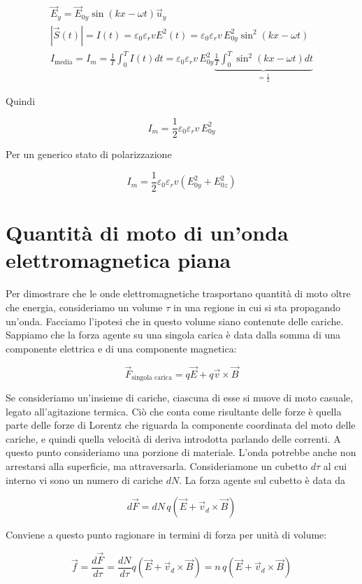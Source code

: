 \begin{gather*}
	\vec{E}_y = \vec{E}_{0y}\sin (kx-\omega t)\vec{u}_y \\
	|\vec{S} (t)| = I(t) = \varepsilon_0 \varepsilon_r vE^2 (t) = \varepsilon_0 \varepsilon_r v\,E_{0y}^2 \sin^2 (kx-\omega t) \\
	I_{\text{media}}= I_m = \frac{1}{T}\int_0^T I(t) dt = \varepsilon_0 \varepsilon_r v\,E_{0y}^2 \underbrace{\frac{1}{T} \int_0^T \sin^2 (kx-\omega t)dt}_{= \frac{1}{2}}
\end{gather*}

Quindi

\[
	I_m = \frac{1}{2} \varepsilon_0 \varepsilon_r v\,E_{0y}^2
\]

Per un generico stato di polarizzazione

\[
	\boxed{I_m = \frac{1}{2} \varepsilon_0 \varepsilon_r v \left( E_{0y}^2 + E_{0z}^2 \right)}
\]

\section{Quantità di moto di un'onda elettromagnetica piana}

Per dimostrare che le onde elettromagnetiche trasportano quantità di moto oltre che energia, consideriamo un volume $ \tau  $ in una regione in cui si sta propagando un'onda. Facciamo l'ipotesi che in questo volume siano contenute delle cariche. Sappiamo che la forza agente su una singola carica è data dalla somma di una componente elettrica e di una componente magnetica:

\[
	\vec{F}_{\text{singola carica}} =q\vec{E} +q\vec{v} \times \vec{B}
\]

Se consideriamo un'insieme di cariche, ciascuna di esse si muove di moto casuale, legato all'agitazione termica. Ciò che conta come risultante delle forze è quella parte delle forze di Lorentz che riguarda la componente coordinata del moto delle cariche, e quindi quella velocità di deriva introdotta parlando delle correnti.
A questo punto consideriamo una porzione di materiale. L'onda potrebbe anche non arrestarsi alla superficie, ma attraversarla. Consideriamone un cubetto $ d\tau  $ al cui interno vi sono un numero di cariche $dN$. La forza agente sul cubetto è data da

\[
	d\vec{F} =dN\,q(\vec{E} +\vec{v}_d\times \vec{B}  )
\]

Conviene a questo punto ragionare in termini di forza per unità di volume:

\[
	\vec{f} = \frac{d\vec{F}}{d\tau}=\frac{dN}{d\tau}q(\vec{E} +\vec{v}_d\times \vec{B}  ) = n\,q(\vec{E} +\vec{v}_d\times \vec{B}  )
\]

